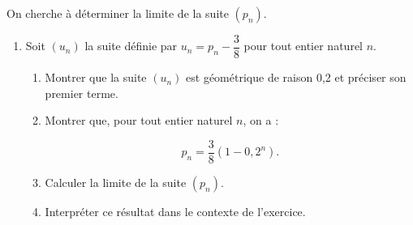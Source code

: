 \documentclass[10pt]{article}
\begin{document}
On cherche à déterminer la limite de la suite $(p_n)$.

\begin{enumerate}[resume]
\item Soit $(u_n)$ la suite définie par $u_n = p_n - \dfrac38$ pour tout entier naturel $n$.
	\begin{enumerate}
		\item Montrer que la suite $(u_n)$ est géométrique de raison 0,2 et préciser son premier terme.
		\item Montrer que, pour tout entier naturel $n$, on a :
		
		\[p_n = \dfrac38\left(1 - 0,2^n\right).\]
		
		\item Calculer la limite de la suite $(p_n)$.
		\item Interpréter ce résultat dans le contexte de l’exercice.
		\end{enumerate}
\end{enumerate}

\medskip
\end{document}
